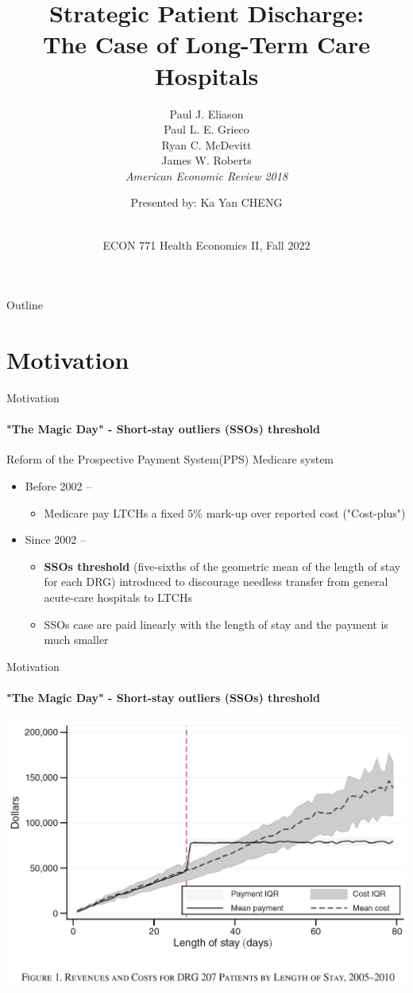 \documentclass{beamer}
\title{Strategic Patient Discharge:\\ The Case of Long-Term Care Hospitals}
\subtitle{Paul J. Eliason\\ Paul L. E. Grieco\\ Ryan C. McDevitt\\ James W. Roberts\\ \textit{American Economic Review 2018}}
\author{Presented by: Ka Yan CHENG}
\date{ \vspace*{-1cm}\\ ECON 771 Health Economics II, Fall 2022}
\begin{document}
\begin{frame}
    \titlepage 
\end{frame}

\logo{}


\begin{frame}{Outline}
    \tableofcontents
\end{frame}


\section{Motivation}

\begin{frame}{Motivation}
\framesubtitle{"The Magic Day" - Short-stay outliers (SSOs) threshold}
Reform of the Prospective Payment System(PPS) Medicare system
\begin{itemize}
	\item Before 2002 -- \\
			\begin{itemize}
				\item Medicare pay LTCHs a fixed 5\% mark-up over reported cost ("Cost-plus")
				\end{itemize}
	\item Since 2002 -- \\
			\begin{itemize}
			\item \textbf{SSOs threshold} (five-sixths of the geometric mean of the length of stay for each DRG) introduced to discourage needless transfer from general acute-care hospitals to LTCHs
			\item SSOs case are paid linearly with the length of stay and the payment is much smaller
			\end{itemize}
\end{itemize}


\end{frame}


\begin{frame}{Motivation}
\framesubtitle{"The Magic Day" - Short-stay outliers (SSOs) threshold}
\includegraphics[width=\textwidth]{Rev_Cost_DRG207}

\end{frame}
\end{document}

